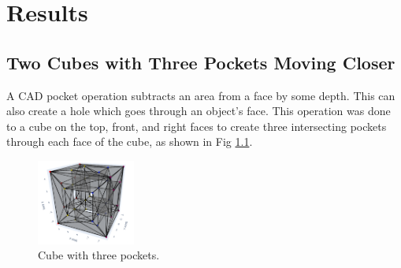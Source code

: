 \documentclass[ma]{uncgdissertationexp}
\theoremstyle{plain}
\theoremstyle{definition}
\theoremstyle{remark}
\begin{document}
\chapter{Results}
\section{Two Cubes with Three Pockets Moving Closer}
\label{sec:two_cubes}
\begin{multicols}{2}
A CAD pocket operation subtracts an area from a face by some depth. This can also create a hole which goes through an object's face. This operation was done to a cube on the top, front, and right faces to create three intersecting pockets through each face of the cube, as shown in Fig \ref{fig:three_pocket_example}.
\columnbreak
\begin{figure}[H]
\begin{center}
	\includegraphics[height=1.1in]{one cube three pockets each.png}
    \caption{Cube with three pockets.}
\label{fig:three_pocket_example}
\end{center}
\end{figure}
\end{multicols}
\vspace{-7.5mm}
\end{document}
